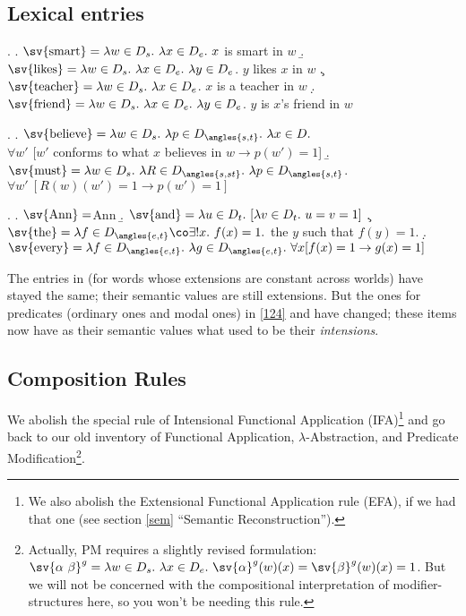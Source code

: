 \subsection{Lexical entries}

\ex.\label{124} \a. $\sv{\mbox{smart}} = \lambda w\in D_{s}.\ \lambda x\in D_{e}.\ x$ is smart in $w$ 
\b. $\sv{\mbox{likes}} = \lambda w\in D_{s}.\ \lambda x\in D_{e}.\ \lambda y\in D_{e}$. $y$ likes $x$ in $w$ 
\c. $\sv{\mbox{teacher}} = \lambda w\in D_{s}.\ \lambda x\in D_{e}$. $x$ is a teacher in $w$ 
\d. $\sv{\mbox{friend}} = \lambda w\in D_{s}.\ \lambda x\in D_{e}.\ \lambda y\in D_{e}$. $y$ is $x$'s friend in $w$

\ex. \a. $\sv{\mbox{believe}} = \lambda w\in D_{s}.\ \lambda p\in D_{\angles{s,t}}.\ \lambda x\in D.$ \\
\null\hfill$\forall w'$ [$w'$ conforms to what $x$ believes in $w \rightarrow p(w') = 1$] 
\b. $\sv{\mbox{must}} = \lambda w\in D_{s}.\ \lambda R\in D_{\angles{s,st}}.\ \lambda p\in D_{\angles{s,t}}$.\\
\null\hfill$\forall w'\ [R(w)(w') = 1 \rightarrow p(w') = 1]$

\ex. \a. $\sv{\mbox{Ann}} = $Ann 
\b. $\sv{\mbox{and}} = \lambda u\in D_{t}.\ [ \lambda v\in D_{t}.\ u=v=1]$ 
\c. $\sv{\mbox{the}} = \lambda f\in D_{\angles{e,t}}\co \exists !x.\ f(x) = 1.$ the $y$ such that $f(y) = 1$. 
\d. $\sv{\mbox{every}} = \lambda f\in D_{\angles{e,t}}.\ \lambda g\in D_{\angles{e,t}}.\ \forall x [ f(x) = 1 \rightarrow g(x) = 1]$

The entries in \Last (for words whose extensions are constant across worlds) have stayed the same; their semantic values are still extensions. But the ones for predicates (ordinary ones and modal ones) in \ref{124} and \LLast have changed; these items now have as their semantic values what used to be their \emph{intensions}.

\subsection{Composition Rules}

We abolish the special rule of Intensional Functional Application (IFA)\footnote{We also abolish the Extensional Functional Application rule (EFA), if we had that one (see section \ref{sem} ``Semantic Reconstruction'').} and go back to our old inventory of Functional Application, $\lambda$-Abstraction, and Predicate Modification\footnote{Actually, PM requires a slightly revised formulation: $\sv{\alpha\ \beta}^g = \lambda w\in D_{s}.\ \lambda x\in D_{e}.\ \sv{\alpha}^g(w)(x) = \sv{\beta}^g(w)(x) = 1$. But we will not be concerned with the compositional interpretation of modifier-structures here, so you won't be needing this rule.}.

